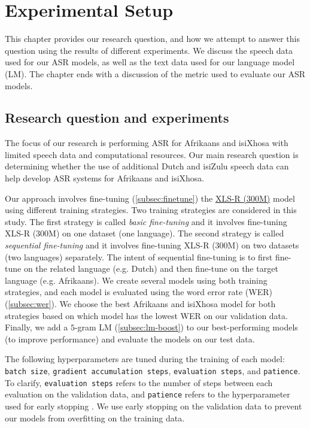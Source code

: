 \graphicspath{{experimental_setup/fig/}}

\chapter{Experimental Setup} \label{chap:experimental_setup}
This chapter provides our research question, and how we attempt to answer
this question using the results of different experiments. We discuss the speech data used for
our ASR models, as well as the text data used for our language model (LM).
The chapter ends with a discussion of the metric used to evaluate our ASR models.

\section{Research question and experiments}
The focus of our research is performing ASR for Afrikaans and isiXhosa with limited speech data and computational resources.
Our main research question is determining whether the use of additional Dutch and isiZulu speech data can help develop ASR systems for Afrikaans and isiXhosa.

Our approach involves fine-tuning (\ref{subsec:finetune}) the \href{https://huggingface.co/facebook/wav2vec2-xls-r-300m}{XLS-R (300M)} model using different training strategies.
Two training strategies are considered in this study. 
The first strategy is called \emph{basic fine-tuning} and it involves fine-tuning XLS-R (300M) on one dataset (one language). 
The second strategy is called \emph{sequential fine-tuning} and it involves fine-tuning XLS-R (300M) on two datasets (two languages) separately. 
The intent of sequential fine-tuning is to first fine-tune on the related language (e.g. Dutch) and then fine-tune on the target language (e.g. Afrikaans).
We create several models using both training strategies, and each model is evaluated using the word error rate (WER) (\ref{subsec:wer}).
We choose the best Afrikaans and isiXhosa model for both strategies based on which model has the lowest WER on our validation data.
Finally, we add a $5$-gram LM (\ref{subsec:lm-boost}) to our best-performing models (to improve performance) and evaluate the models on our test data.

The following hyperparameters are tuned during the training of each model: 
\texttt{batch size}, \texttt{gradient accumulation steps}, \texttt{evaluation steps}, and \texttt{patience}.
To clarify, \texttt{evaluation steps} refers to the number of steps between each evaluation on the validation data,
and \texttt{patience} refers to the hyperparameter used for early stopping \cite{wikipedia2023early_stopping}. 
We use early stopping on the validation data to prevent our models from overfitting on the training data.

